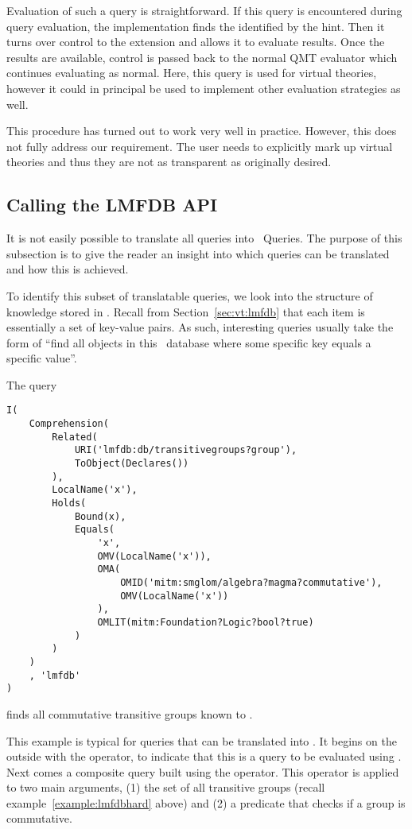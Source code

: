 Evaluation of such a query is straightforward. 
If this query is encountered during query evaluation, the implementation finds the  identified by the hint. 
Then it turns over control to the extension and allows it to evaluate results. 
Once the results are available, control is passed back to the normal QMT evaluator which continues evaluating as normal. 
Here, this query is used for virtual theories, however it could in principal be used to implement other evaluation strategies as well. 

This procedure has turned out to work very well in practice. 
However, this does not fully address our requirement. 
The user needs to explicitly mark up virtual theories and thus they are not as transparent as originally desired. 

\subsection{Calling the LMFDB API}\label{sec:comm:lmfdbapi}

It is not easily possible to translate all queries into \lmfdb\ Queries. 
The purpose of this subsection is to give the reader an insight into which queries can be translated and how this is achieved. 

To identify this subset of translatable queries, we look into the structure of knowledge stored in \lmfdb. 
Recall from Section~\ref{sec:vt:lmfdb} that each item is essentially a set of key-value pairs. 
As such, interesting queries usually take the form of ``find all objects in this \lmfdb\ database where some specific key equals a specific value''. 

\begin{example}\label{example:lmfdblong}
	The query
	\begin{lstlisting}[language=qmt]
I(
	Comprehension(
		Related(
			URI('lmfdb:db/transitivegroups?group'), 
			ToObject(Declares())
		), 
		LocalName('x'), 
		Holds(
			Bound(x), 
			Equals(
				'x', 
				OMV(LocalName('x')), 
				OMA(
					OMID('mitm:smglom/algebra?magma?commutative'), 
					OMV(LocalName('x'))
				), 
				OMLIT(mitm:Foundation?Logic?bool?true)
			)
		)
	)
	, 'lmfdb'
)
\end{lstlisting} finds all commutative transitive groups known to \lmfdb. 
\end{example}

This example is typical for queries that can be translated into \lmfdb. 
It begins on the outside with the  operator, to indicate that this is a query to be evaluated using \lmfdb. 
Next comes a composite query built using the  operator. 
This operator is applied to two main arguments, (1) the set of all transitive groups (recall example~\ref{example:lmfdbhard} above) and (2) a predicate that checks if a group is commutative. 

